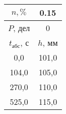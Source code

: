 \begin{tabular}[t]{|c|c|}
\hline
$n, \%$ & 0.15 \\
\hline
$P$, дел & 0 \\
\hline
$t_{абс}$, с & $h$, мм \\ 
\hline
0,0 & 101,0 \\ 
104,0 & 105,0 \\ 
270,0 & 110,0 \\ 
525,0 & 115,0 \\ 
\hline
\end{tabular}